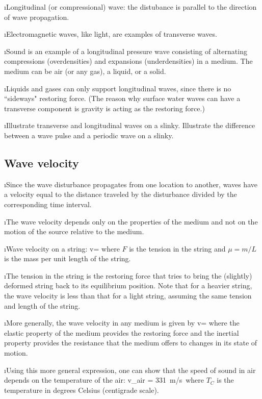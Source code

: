 \i Longitudinal (or compressional) wave: 
the distubance is parallel to the direction of 
wave propagation.

\i Electromagnetic waves, like light, are examples
of transverse waves.

\i Sound is an example of a longitudinal pressure wave 
consisting
of alternating compressions (overdensities) 
and expansions (underdensities) in a medium.
The medium can be air (or any gas), a liquid, or a solid.

\i Liquids and gases can only support 
longitudinal waves, since there is no ``sideways" 
restoring force.
(The reason why surface water waves can have a 
transverse component is gravity is acting as the
restoring force.)

\i \demo Illustrate transverse and longitudinal waves on a slinky.
Illustrate the difference between a wave pulse and 
a periodic wave on a slinky.

\ei

\subsection{Wave velocity}

\bi

\i Since the wave disturbance propagates from one location 
to another, waves have a velocity equal to the distance
traveled by the disturbance divided by the corresponding time
interval.

\i The wave velocity depends only on the properties of
the medium and not on the motion of the source relative
to the medium.

\i Wave velocity on a string: 
%
\be
v=
\ee
%
where $F$ is the tension in the string and $\mu=m/L$ is the
mass per unit length of the string.

\i The tension in the string is the restoring force that
tries to bring the (slightly) deformed string back to its equilibrium
position.
Note that for a heavier string, the wave velocity is
less than that for a light string, assuming the same tension
and length of the string.

\i More generally, the wave velocity in any medium is
given by 
%
\be
v=
\ee
%
where the elastic property of the medium provides the restoring 
force and the inertial property provides the resistance that 
the medium offers to changes in its state of motion.

\i Using this more general expression, one can show that 
the speed of sound in air depends on the temperature of 
the air:
%
\be
v_{\rm air} = 331~{\rm m/s}\,
\ee
%
where $T_C$ is the temperature in degrees Celsius 
(centigrade scale).

